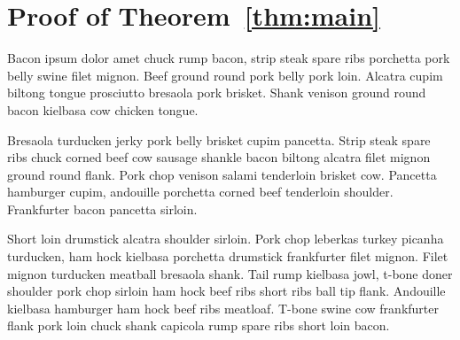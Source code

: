 \section{Proof of Theorem~\ref{thm:main}}\label{sec:finalproof}

Bacon ipsum dolor amet chuck rump bacon, strip steak spare ribs porchetta pork
belly swine filet mignon. Beef ground round pork belly pork loin. Alcatra cupim
biltong tongue prosciutto bresaola pork brisket. Shank venison ground round
bacon kielbasa cow chicken tongue.

Bresaola turducken jerky pork belly brisket cupim pancetta. Strip steak spare
ribs chuck corned beef cow sausage shankle bacon biltong alcatra filet mignon
ground round flank. Pork chop venison salami tenderloin brisket cow. Pancetta
hamburger cupim, andouille porchetta corned beef tenderloin shoulder.
Frankfurter bacon pancetta sirloin.

Short loin drumstick alcatra shoulder sirloin. Pork chop leberkas turkey
picanha turducken, ham hock kielbasa porchetta drumstick frankfurter filet
mignon. Filet mignon turducken meatball bresaola shank. Tail rump kielbasa
jowl, t-bone doner shoulder pork chop sirloin ham hock beef ribs short ribs
ball tip flank. Andouille kielbasa hamburger ham hock beef ribs meatloaf.
T-bone swine cow frankfurter flank pork loin chuck shank capicola rump spare
ribs short loin bacon.
